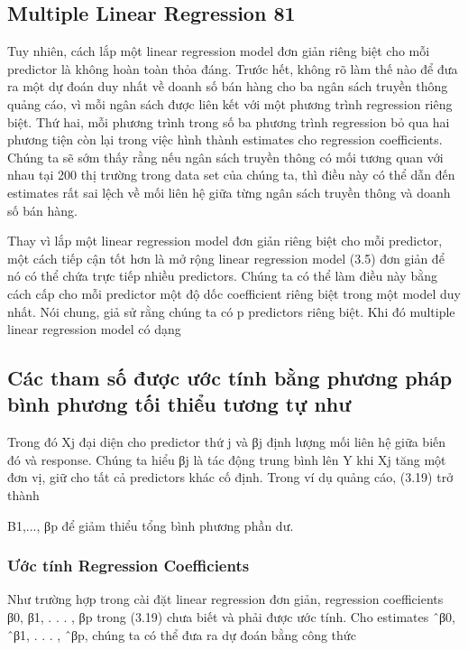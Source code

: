 \subsection{Multiple Linear Regression 81}

Tuy nhiên, cách lắp một linear regression model đơn giản riêng biệt cho mỗi predictor là không hoàn toàn thỏa đáng. Trước hết, không rõ làm thế nào để đưa ra một dự đoán duy nhất về doanh số bán hàng cho ba ngân sách truyền thông quảng cáo, vì mỗi ngân sách được liên kết với một phương trình regression riêng biệt. Thứ hai, mỗi phương trình trong số ba phương trình regression bỏ qua hai phương tiện còn lại trong việc hình thành estimates cho regression coefficients. Chúng ta sẽ sớm thấy rằng nếu ngân sách truyền thông có mối tương quan với nhau tại 200 thị trường trong data set của chúng ta, thì điều này có thể dẫn đến estimates rất sai lệch về mối liên hệ giữa từng ngân sách truyền thông và doanh số bán hàng.

Thay vì lắp một linear regression model đơn giản riêng biệt cho mỗi predictor, một cách tiếp cận tốt hơn là mở rộng linear regression model (3.5) đơn giản để nó có thể chứa trực tiếp nhiều predictors. Chúng ta có thể làm điều này bằng cách cấp cho mỗi predictor một độ dốc coefficient riêng biệt trong một model duy nhất. Nói chung, giả sử rằng chúng ta có p predictors riêng biệt. Khi đó multiple linear regression model có dạng

\subsection{Các tham số được ước tính bằng phương pháp bình phương tối thiểu tương tự như}

Trong đó Xj đại diện cho predictor thứ j và βj định lượng mối liên hệ giữa biến đó và response. Chúng ta hiểu βj là tác động trung bình lên Y khi Xj tăng một đơn vị, giữ cho tất cả predictors khác cố định. Trong ví dụ quảng cáo, (3.19) trở thành

Β1,..., βp để giảm thiểu tổng bình phương phần dư.

\subsubsection{Ước tính Regression Coefficients}

Như trường hợp trong cài đặt linear regression đơn giản, regression coefficients β0, β1, . . . , βp trong (3.19) chưa biết và phải được ước tính. Cho estimates ˆβ0, ˆβ1, . . . , ˆβp, chúng ta có thể đưa ra dự đoán bằng công thức

